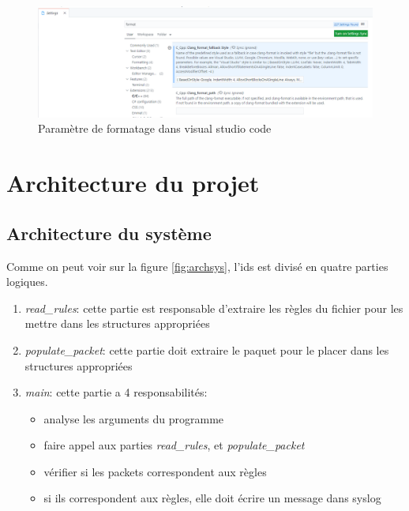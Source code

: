 \documentclass[a4paper]{article}
\begin{document}
\begin{figure}[H]
    \centering
    \includegraphics[width=0.99\linewidth]{../markdown-explanations/images/setup-04.PNG}
    \caption{Paramètre de formatage dans visual studio code}
    \label{fig:formatting}
\end{figure}










\section{Architecture du projet}





\subsection{Architecture du système}



Comme on peut voir sur la figure \ref{fig:archsys}, l'ids est divisé en quatre parties logiques.
\begin{enumerate}
    \item \textit{read\_rules}: cette partie est responsable d'extraire les règles du fichier pour les mettre dans les structures appropriées
    \item \textit{populate\_packet}: cette partie doit extraire le paquet pour le placer dans les structures appropriées
    \item \textit{main}: cette partie a 4 responsabilités:
    \begin{itemize}
        \item analyse les arguments du programme
        \item faire appel aux parties \textit{read\_rules}, et \textit{populate\_packet}
        \item vérifier si les packets correspondent aux règles
        \item si ils correspondent aux règles, elle doit écrire un message dans syslog
    \end{itemize}
\end{enumerate}
\end{document}
